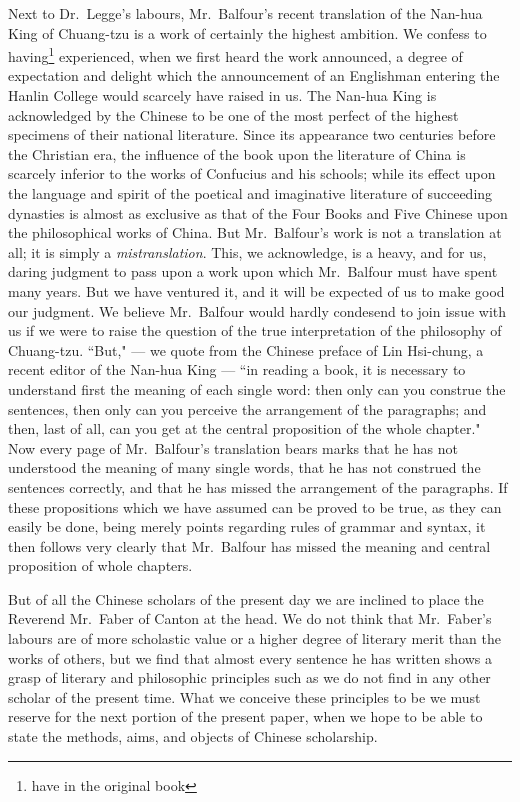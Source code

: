 Next to Dr.~Legge's labours, Mr.~Balfour's recent translation of the Nan-hua King  of Chuang-tzu  is a work of certainly the highest ambition.
We confess to having\footnote{have in the original book} experienced, when we first heard the work announced, a degree of expectation and delight which the announcement of an Englishman entering the Hanlin College  would scarcely have raised in us.
The Nan-hua King is acknowledged by the Chinese to be one of the most perfect of the highest specimens of their national literature.
Since its appearance two centuries before the Christian era, the influence of the book upon the literature of China is scarcely inferior to the works of Confucius and his schools; while its effect upon the language and spirit of the poetical and imaginative literature of succeeding dynasties is almost as exclusive as that of the Four Books and Five Chinese  upon the philosophical works of China.
But Mr.~Balfour's work is not a translation at all; it is simply a \emph{mistranslation}.
This, we acknowledge, is a heavy, and for us, daring judgment to pass upon a work upon which Mr.~Balfour must have spent many years.
But we have ventured it, and it will be expected of us to make good our judgment.
We believe Mr.~Balfour would hardly condesend to join issue with us if we were to raise the question of the true interpretation of the philosophy of Chuang-tzu.
``But," --- we quote from the Chinese preface of Lin Hsi-chung, a recent editor of the Nan-hua King --- ``in reading a book, it is necessary to understand first the meaning of each single word: then only can you construe the sentences, then only can you perceive the arrangement of the paragraphs; and then, last of all, can you get at the central proposition of the whole chapter."
Now every page of Mr.~Balfour's translation bears marks that he has not understood the meaning of many single words, that he has not construed the sentences correctly, and that he has missed the arrangement of the paragraphs.
If these propositions which we have assumed can be proved to be true, as they can easily be done, being merely points regarding rules of grammar and syntax, it then follows very clearly that Mr.~Balfour has missed the meaning and central proposition of whole chapters.

But of all the Chinese scholars of the present day we are inclined to place the Reverend Mr.~Faber of Canton at the head.
We do not think that Mr.~Faber's labours are of more scholastic value or a higher degree of literary merit than the works of others, but we find that almost every sentence he has written shows a grasp of literary and philosophic principles such as we do not find in any other scholar of the present time.
What we conceive these principles to be we must reserve for the next portion of the present paper, when we hope to be able to state the methods, aims, and objects of Chinese scholarship.

